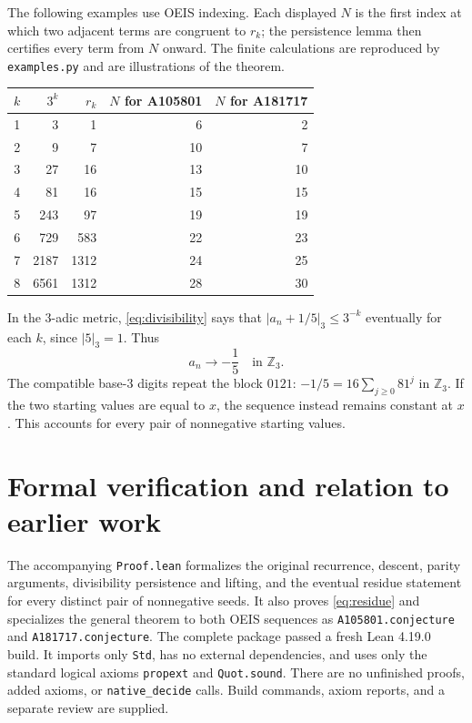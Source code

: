\documentclass[11pt]{article}
\newcommand{\Z}{\mathbb Z}
\begin{document}
The following examples use OEIS indexing. Each displayed $N$ is the first
index at which two adjacent terms are congruent to $r_k$; the persistence
lemma then certifies every term from $N$ onward. The finite calculations are
reproduced by \texttt{examples.py} and are illustrations of the theorem.
\begin{center}
\begin{tabular}{rrrrr}
\toprule
$k$ & $3^k$ & $r_k$ & $N$ for A105801 & $N$ for A181717\\
\midrule
1&3&1&6&2\\
2&9&7&10&7\\
3&27&16&13&10\\
4&81&16&15&15\\
5&243&97&19&19\\
6&729&583&22&23\\
7&2187&1312&24&25\\
8&6561&1312&28&30\\
\bottomrule
\end{tabular}
\end{center}

In the $3$-adic metric, \eqref{eq:divisibility} says that
$|a_n+1/5|_3\le3^{-k}$ eventually for each $k$, since $|5|_3=1$.
Thus
\[
 \boxed{\displaystyle a_n\longrightarrow-\frac15\quad\text{in }\Z_3.}
\]
The compatible base-$3$ digits repeat the block $0121$:
$-1/5=16\sum_{j\ge0}81^j$ in $\Z_3$.
If the two starting values are equal to $x$, the sequence instead remains
constant at $x$. This accounts for every pair of nonnegative starting values.

\section{Formal verification and relation to earlier work}

The accompanying \texttt{Proof.lean} formalizes the original recurrence,
descent, parity arguments, divisibility persistence and lifting, and the
eventual residue statement for every distinct pair of nonnegative seeds.
It also proves \eqref{eq:residue} and specializes the general theorem to both
OEIS sequences as \texttt{A105801.conjecture} and \texttt{A181717.conjecture}.
The complete package passed a fresh Lean 4.19.0 build. It imports only
\texttt{Std}, has no external dependencies, and uses only the standard
logical axioms \texttt{propext} and \texttt{Quot.sound}. There are no
unfinished proofs, added axioms, or \texttt{native\_decide} calls.
Build commands, axiom reports, and a separate review are supplied.
\end{document}
